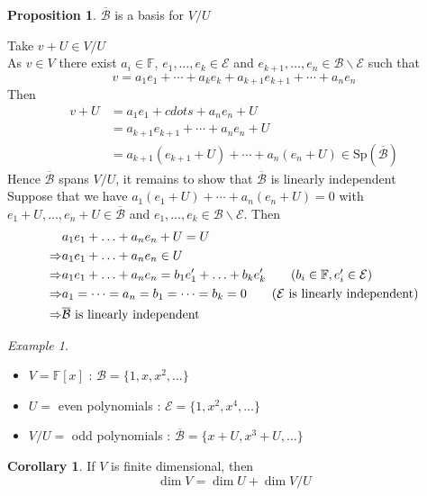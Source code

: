 \documentclass[11pt, a4paper]{report}
\makeatletter
\numberwithin{equation}{section}
\newcommand{\bk}{\backslash}
\newcommand{\F}{\mathbb{F}}
\newcommand{\Sp}{\text{Sp}}
\numberwithin{equation}{subsection}
\theoremstyle{plain}
\theoremstyle{definition}
\newtheorem{prop}[thm]{Proposition}
\newtheorem{cor}[thm]{Corollary}
\theoremstyle{remark}
\newtheorem{exmp}{Example}[chapter]
\newtheorem*{prf}{Proof}
\renewenvironment{prf}[1][\proofname]{\par
  \vspace{-\topsep}%
  \normalfont
  \topsep0pt \partopsep0pt %
  \trivlist
  \item[\hskip\labelsep
        \itshape
    #1\@addpunct{.}]\ignorespaces
}{%
  \popQED\endtrivlist\@endpefalse
  \addvspace{6pt plus 6pt} %
}
\newcommand{\pr}[1]{\begin{adjustwidth}{1cm}{} \begin{prf} #1 \end{prf} \end{adjustwidth}}
\makeatother
\begin{document}
\begin{prop} $\overline{\mathcal{B}}$ is a basis for $V/U$
\pr{
Take $v + U \in V/U$\\
As $v \in V$ there exist $a_i \in \F$, $e_1, \ldots, e_k \in \mathcal{E}$ and $e_{k+1}, \ldots, e_n \in \mathcal{B} \bk \mathcal{E}$ such that $$v = a_1 e_1 + \cdots + a_k e_k + a_{k+1} e_{k+1} + \cdots + a_n e_n$$
Then
\begin{align*}
v+U 	&= a_1 e_1 + cdots + a_n e_n + U\\
		&= a_{k+1} e_{k+1} + \cdots + a_n e_n + U \tag{$a_1 e_1 + \cdots + a_k e_k \in U$}\\
		&= a_{k+1} (e_{k+1} + U) + \cdots + a_n (e_n + U) \in \Sp \left( \overline{\mathcal{B}} \right)
\end{align*}
Hence $\overline{\mathcal{B}}$ spans $V/U$, it remains to show that $\overline{\mathcal{B}}$ is linearly independent\\
Suppose that we have $a_1(e_1 + U) + \cdots + a_n (e_n + U) = 0$ with $e_1 + U, \ldots, e_n + U \in \overline{\mathcal{B}}$ and $e_1, \ldots, e_k \in \mathcal{B} \bk \mathcal{E}$. Then
\begin{align*}
				&a_1 e_1 + \ldots + a_n e_n + U = U\\
\Rightarrow	 	&a_1 e_1 + \ldots + a_n e_n \in U\\
\Rightarrow		&a_1 e_1 + \ldots + a_n e_n = b_1 e'_1 + \ldots + b_k e'_k \tag{$b_i \in \F, e'_i \in \mathcal{E}$}\\
\Rightarrow 	&a_1 = \cdots = a_n = b_1 = \cdots = b_k = 0 \tag{$\mathcal{E}$ is linearly independent}\\
\Rightarrow		&\overline{\mathcal{B}} \text{ is linearly independent}
\end{align*}
}\end{prop}

\begin{exmp}${}$
\begin{itemize}
\item[] $V = \F[x]$ : $\mathcal{B} = \{1, x, x^2, \ldots\}$
\item[] $U =$ even polynomials : $\mathcal{E} = \{1, x^2, x^4, \ldots\}$
\item[] $V/U =$ odd polynomials : $\overline{\mathcal{B}} = \{x + U, x^3 + U, \ldots \}$\\
\end{itemize}
\end{exmp}

\begin{cor} If $V$ is finite dimensional, then $$\dim V = \dim U + \dim V/U$$ \end{cor}
\end{document}
